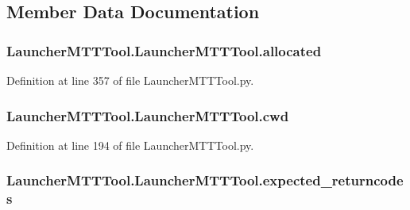 \subsection{Member Data Documentation}
\hypertarget{class_launcher_m_t_t_tool_1_1_launcher_m_t_t_tool_a79266b94da58ec136cca44c1f735d3a7}{
\subsubsection[{allocated}]{\setlength{\rightskip}{0pt plus 5cm}Launcher\-M\-T\-T\-Tool.\-Launcher\-M\-T\-T\-Tool.\-allocated}}\label{class_launcher_m_t_t_tool_1_1_launcher_m_t_t_tool_a79266b94da58ec136cca44c1f735d3a7}


Definition at line 357 of file Launcher\-M\-T\-T\-Tool.\-py.

\hypertarget{class_launcher_m_t_t_tool_1_1_launcher_m_t_t_tool_a7bcf1056b03f3777ef4ed39f7e063f36}{
\subsubsection[{cwd}]{\setlength{\rightskip}{0pt plus 5cm}Launcher\-M\-T\-T\-Tool.\-Launcher\-M\-T\-T\-Tool.\-cwd}}\label{class_launcher_m_t_t_tool_1_1_launcher_m_t_t_tool_a7bcf1056b03f3777ef4ed39f7e063f36}


Definition at line 194 of file Launcher\-M\-T\-T\-Tool.\-py.

\hypertarget{class_launcher_m_t_t_tool_1_1_launcher_m_t_t_tool_ae68abb344ae827a5ce0ee79446020c63}{
\subsubsection[{expected\-\_\-returncodes}]{\setlength{\rightskip}{0pt plus 5cm}Launcher\-M\-T\-T\-Tool.\-Launcher\-M\-T\-T\-Tool.\-expected\-\_\-returncodes}}\label{class_launcher_m_t_t_tool_1_1_launcher_m_t_t_tool_ae68abb344ae827a5ce0ee79446020c63}


